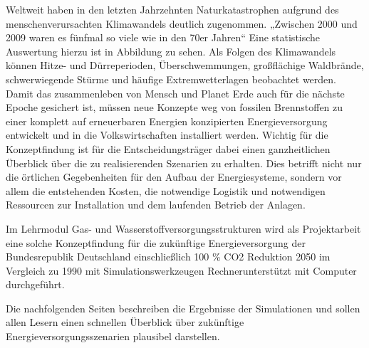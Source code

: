 \newpage
{}
Weltweit haben in den letzten Jahrzehnten Naturkatastrophen aufgrund des menschenverursachten Klimawandels deutlich zugenommen. „Zwischen 2000 und 2009 waren es fünfmal so viele wie in den 70er Jahren“ 
Eine statistische Auswertung hierzu ist in Abbildung  zu sehen. Als Folgen des Klimawandels können Hitze- und Dürreperioden, Überschwemmungen, großflächige Waldbrände, schwerwiegende Stürme und häufige Extremwetterlagen beobachtet werden.
Damit das zusammenleben von Mensch und Planet Erde auch für die nächste Epoche gesichert ist, müssen neue Konzepte weg von fossilen Brennstoffen zu einer komplett auf erneuerbaren Energien konzipierten Energieversorgung entwickelt und in die Volkswirtschaften installiert
werden. Wichtig für die Konzeptfindung ist für die Entscheidungsträger dabei einen ganzheitlichen Überblick über die zu realisierenden Szenarien zu erhalten. Dies betrifft nicht nur die örtlichen Gegebenheiten für den Aufbau der Energiesysteme, sondern vor allem die entstehenden Kosten, die notwendige Logistik und notwendigen Ressourcen zur Installation und dem laufenden Betrieb der Anlagen. 

Im Lehrmodul Gas- und Wasserstoffversorgungsstrukturen wird als Projektarbeit eine solche Konzeptfindung für die zukünftige Energieversorgung der Bundesrepublik Deutschland einschließlich 100 \% CO2 Reduktion 2050 im Vergleich zu 1990 mit Simulationswerkzeugen Rechnerunterstützt mit Computer durchgeführt. 

Die nachfolgenden Seiten beschreiben die Ergebnisse der Simulationen und sollen allen Lesern einen schnellen Überblick über zukünftige Energieversorgungsszenarien plausibel darstellen. 


